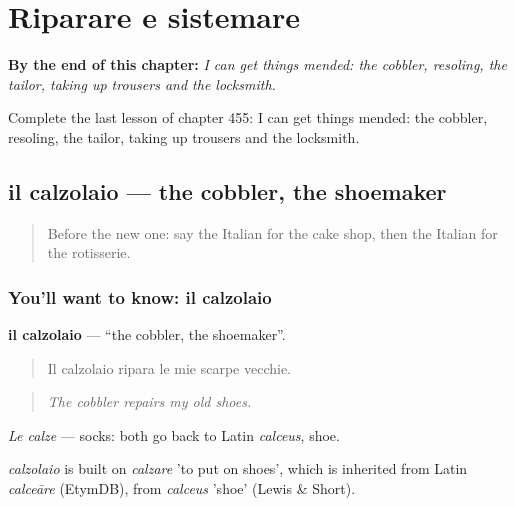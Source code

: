 
\chapter{Riparare e sistemare}
\label{ch:it-riparare-e-sistemare}

\begin{chapteropening}
\textbf{By the end of this chapter:} \emph{I can get things mended: the cobbler, resoling, the tailor, taking up trousers and the locksmith.}

Complete the last lesson of chapter 455: I can get things mended: the cobbler, resoling, the tailor, taking up trousers and the locksmith.
\end{chapteropening}

\section[il calzolaio]{il calzolaio — the cobbler, the shoemaker}

\label{lesson:IT-C455-calzolaio}



\begin{quote}
Before the new one: say the Italian for the cake shop, then the Italian for the rotisserie.
\end{quote}

\subsection*{You'll want to know: il calzolaio}
\textbf{il calzolaio} — \textquotedblleft{}the cobbler, the shoemaker\textquotedblright{}.

\begin{quote}
Il calzolaio ripara le mie scarpe vecchie.
\end{quote}

\begin{quote}
\emph{The cobbler repairs my old shoes.}
\end{quote}

\emph{Le calze} — socks: both go back to Latin \emph{calceus}, shoe.

\begin{cousinweb}
\emph{calzolaio} is built on \emph{calzare} 'to put on shoes', which is inherited from Latin \emph{calceāre} (EtymDB), from \emph{calceus} 'shoe' (Lewis \& Short).
\end{cousinweb}

